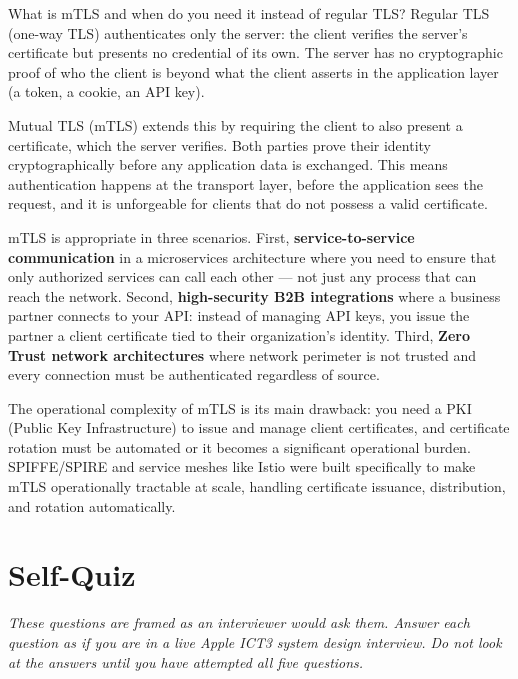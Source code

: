 \documentclass[11pt,a4paper]{article}
\begin{document}
\begin{curiobox}{What is mTLS and when do you need it instead of regular TLS?}
Regular TLS (one-way TLS) authenticates only the server: the client verifies the server's certificate but presents no credential of its own. The server has no cryptographic proof of who the client is beyond what the client asserts in the application layer (a token, a cookie, an API key).

Mutual TLS (mTLS) extends this by requiring the client to also present a certificate, which the server verifies. Both parties prove their identity cryptographically before any application data is exchanged. This means authentication happens at the transport layer, before the application sees the request, and it is unforgeable for clients that do not possess a valid certificate.

mTLS is appropriate in three scenarios. First, \textbf{service-to-service communication} in a microservices architecture where you need to ensure that only authorized services can call each other --- not just any process that can reach the network. Second, \textbf{high-security B2B integrations} where a business partner connects to your API: instead of managing API keys, you issue the partner a client certificate tied to their organization's identity. Third, \textbf{Zero Trust network architectures} where network perimeter is not trusted and every connection must be authenticated regardless of source.

The operational complexity of mTLS is its main drawback: you need a PKI (Public Key Infrastructure) to issue and manage client certificates, and certificate rotation must be automated or it becomes a significant operational burden. SPIFFE/SPIRE and service meshes like Istio were built specifically to make mTLS operationally tractable at scale, handling certificate issuance, distribution, and rotation automatically.
\end{curiobox}

\newpage
\section{Self-Quiz}

\textit{These questions are framed as an interviewer would ask them. Answer each question as if you are in a live Apple ICT3 system design interview. Do not look at the answers until you have attempted all five questions.}
\end{document}
